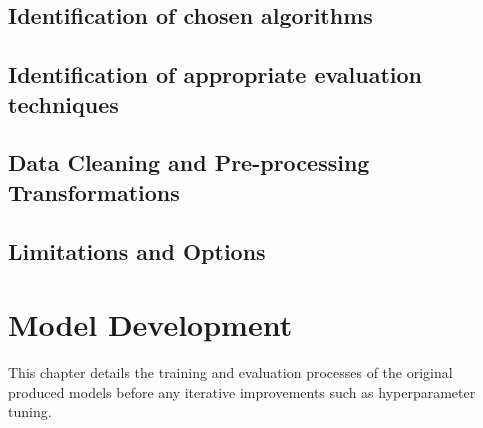 \documentclass[12pt]{report}
\begin{document}
\section{Identification of chosen algorithms}


\section{Identification of appropriate evaluation techniques}

\section{Data Cleaning and Pre-processing Transformations}\label{sec:Preprocessing}

\section{Limitations and Options}


\chapter{Model Development} %
This chapter details the training and evaluation processes of the original produced models
before any iterative improvements such as hyperparameter tuning.
\end{document}
